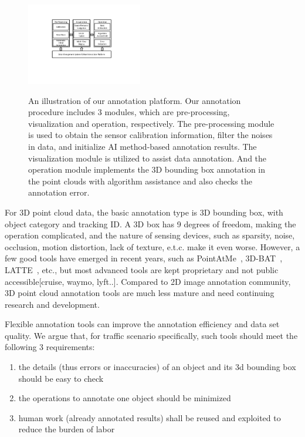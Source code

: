 \documentclass[letterpaper, 10 pt, conference]{ieeeconf}  %
\begin{document}
\begin{figure}[htbp]
	\centering
	\includegraphics[width=0.45\textwidth]{./figures/arch}\\ %
	\caption{An illustration of our annotation platform. Our annotation procedure includes 3 modules, which are pre-processing, visualization and operation, respectively. The pre-processing module is used to obtain the sensor calibration information, filter the noises in data, and initialize AI method-based annotation results. The visualization module is utilized to assist data annotation. And the operation module implements the 3D bounding box annotation in the point clouds with algorithm assistance and also checks the annotation error.}
	\label{fig:main-arch}
	\vspace{-0.3cm}
\end{figure}




For 3D point cloud data, the basic annotation type is 3D bounding box, with object category and tracking ID. A 3D box has 9 degrees of freedom, making the operation complicated, and the nature of sensing devices, such as sparsity, noise, occlusion, motion distortion, lack of texture, e.t.c. make it even worse.
However, a few good tools have emerged in recent years, such as  PointAtMe~\cite{pointatme}, 3D-BAT~\cite{Zimmer20193DBA}, LATTE~\cite{Wang2019LATTEAL}, etc., but most advanced tools are kept proprietary and not public accessible[cruise, waymo, lyft..]. Compared to 2D image annotation community, 3D point cloud annotation tools are much less mature and need continuing research and development.

Flexible annotation tools can improve the annotation efficiency and data set quality.
We argue that, for traffic scenario specifically,  such tools should meet the following 3 requirements:

\begin{enumerate}
	\label{intro-requirements}
	\item the details (thus errors or inaccuracies) of an object and its 3d bounding box should be easy to check
	\item the operations to annotate one object should be minimized
	\item human work (already annotated results) shall be reused and exploited to reduce the burden of labor
\end{enumerate}
\end{document}
